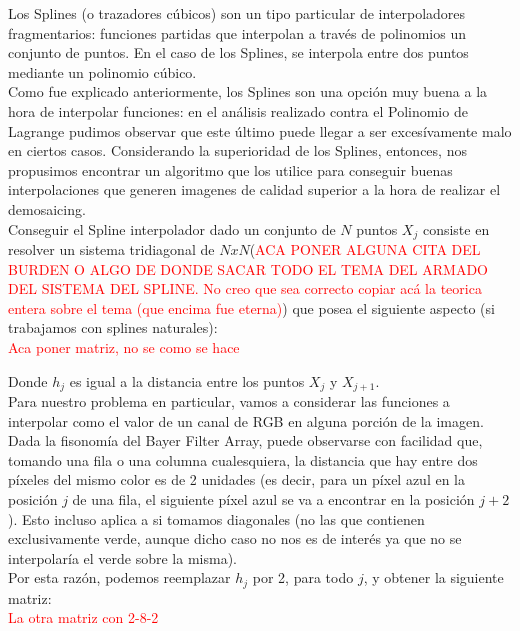 \documentclass[a4paper]{article}
\begin{document}
Los Splines (o trazadores cúbicos) son un tipo particular de interpoladores fragmentarios: funciones partidas que interpolan a través de polinomios un conjunto de puntos. En el caso de los Splines, se interpola entre dos puntos mediante un polinomio cúbico.\\

Como fue explicado anteriormente, los Splines son una opción muy buena a la hora de interpolar funciones: en el análisis realizado contra el Polinomio de Lagrange pudimos observar que este último puede llegar a ser excesívamente malo en ciertos casos. Considerando la superioridad de los Splines, entonces, nos propusimos encontrar un algoritmo que los utilice para conseguir buenas interpolaciones que generen imagenes de calidad superior a la hora de realizar el demosaicing.\\

Conseguir el Spline interpolador dado un conjunto de $N$ puntos $X_j$ consiste en resolver un sistema tridiagonal de $NxN$(\textcolor{red}{ACA PONER ALGUNA CITA DEL BURDEN O ALGO DE DONDE SACAR TODO EL TEMA DEL ARMADO DEL SISTEMA DEL SPLINE. No creo que sea correcto copiar acá la teorica entera sobre el tema (que encima fue eterna)}) que posea el siguiente aspecto (si trabajamos con splines naturales): \\

\textcolor{red}{Aca poner matriz, no se como se hace\\}

\noindent Donde $h_j$ es igual a la distancia entre los puntos $X_j$ y $X_{j+1}$. \\

Para nuestro problema en particular, vamos a considerar las funciones a interpolar como el valor de un canal de RGB en alguna porción de la imagen. Dada la fisonomía del Bayer Filter Array, puede observarse con facilidad que, tomando una fila o una columna cualesquiera, la distancia que hay entre dos píxeles del mismo color es de 2 unidades (es decir, para un p\'ixel azul en la posición $j$ de una fila, el siguiente p\'ixel azul se va a encontrar en la posición $j+2$). Esto incluso aplica a si tomamos diagonales (no las que contienen exclusivamente verde, aunque dicho caso no nos es de interés ya que no se interpolaría el verde sobre la misma). \\
Por esta razón, podemos reemplazar $h_j$ por 2, para todo $j$, y obtener la siguiente matriz: \\

\textcolor{red}{La otra matriz con 2-8-2\\}
\end{document}
